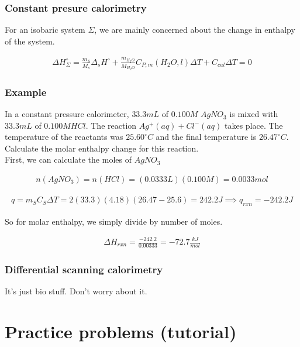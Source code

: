 \documentclass[12pt]{book}
\begin{document}
\subsection*{Constant presure calorimetry}

For an isobaric system $\Sigma$, we are mainly concerned about the change in enthalpy of the system.

\begin{align*}
    \Delta H_\Sigma^{\circ}=\frac{m_S}{M_s}\Delta_s H^{\circ}+\frac{m_{H_2O}}{M_{H_2O}}C_{P,m}(H_2O,l)\Delta T+C_{cal}\Delta T=0
\end{align*}

\subsection*{Example}

In a constant pressure calorimeter, $33.3 mL$ of $0.100 M$ $AgNO_3$ is mixed with $33.3 mL$ of $0.100 M HCl$. The
reaction $Ag^+(aq) + Cl^-(aq)$ takes place. The temperature of the reactants was $25.60 ^{\circ}C$ and the final temperature is
$26.47^{\circ}C$. Calculate the molar enthalpy change for this reaction.\\

First, we can calculate the moles of $AgNO_3$

\begin{align*}
n(AgNO_3)=n(HCl)=(0.0333L)(0.100M)=0.0033 mol
\end{align*}

\begin{align*}
    q=m_S C_S\Delta T=2(33.3)(4.18)(26.47-25.6)=242.2J\implies q_{rxn}=-242.2J
\end{align*}

So for molar enthalpy, we simply divide by number of moles.

\begin{align*}
    \Delta H_{rxn}=\frac{-242.2}{0.00333}=-72.7\frac{kJ}{mol}
\end{align*}

\subsection*{Differential scanning calorimetry}

It's just bio stuff. Don't worry about it.

\chapter*{Practice problems (tutorial)}
\end{document}
